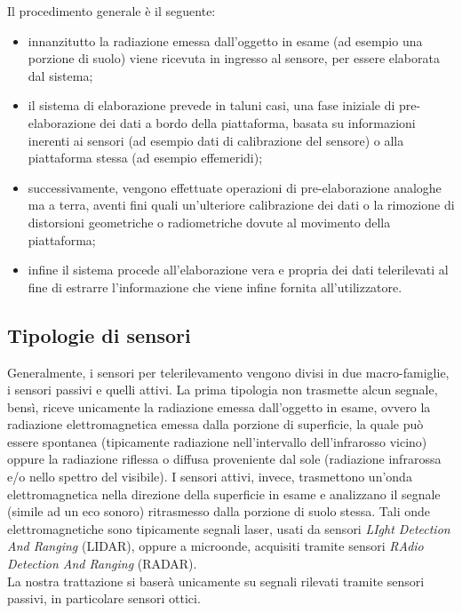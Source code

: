 Il procedimento generale è il seguente:
\begin{itemize}
\item innanzitutto la radiazione emessa dall'oggetto in esame (ad esempio una porzione di suolo) viene ricevuta in ingresso al sensore, per essere elaborata dal sistema;
\item il sistema di elaborazione prevede in taluni casi, una fase iniziale di pre-elaborazione dei dati a bordo della piattaforma, basata su informazioni inerenti ai sensori (ad esempio dati di calibrazione del sensore) o alla piattaforma stessa (ad esempio effemeridi);
\item successivamente, vengono effettuate operazioni di pre-elaborazione analoghe ma a terra, aventi fini quali un'ulteriore calibrazione dei dati o la rimozione di distorsioni geometriche o radiometriche dovute al movimento della piattaforma;
\item infine il sistema procede all'elaborazione vera e propria dei dati telerilevati al fine di estrarre l'informazione che viene infine fornita all'utilizzatore.
\end{itemize}


\subsection{Tipologie di sensori}

Generalmente, i sensori per telerilevamento vengono divisi in due macro-famiglie, i sensori passivi e quelli attivi.
La prima tipologia non trasmette alcun segnale, bensì, riceve unicamente la radiazione emessa dall'oggetto in esame, ovvero la radiazione elettromagnetica emessa dalla porzione di superficie, la quale può essere spontanea (tipicamente radiazione nell'intervallo dell'infrarosso vicino) oppure la radiazione riflessa o diffusa proveniente dal sole (radiazione infrarossa e/o nello spettro del visibile).
I sensori attivi, invece, trasmettono un'onda elettromagnetica nella direzione della superficie in esame e analizzano il segnale (simile ad un eco sonoro) ritrasmesso dalla porzione di suolo stessa.
Tali onde elettromagnetiche sono tipicamente segnali laser, usati da sensori \emph{LIght Detection And Ranging} (LIDAR), oppure a microonde, acquisiti tramite sensori \emph{RAdio Detection And Ranging} (RADAR).
\\

La nostra trattazione si baserà unicamente su segnali rilevati tramite sensori passivi, in particolare sensori ottici.  


